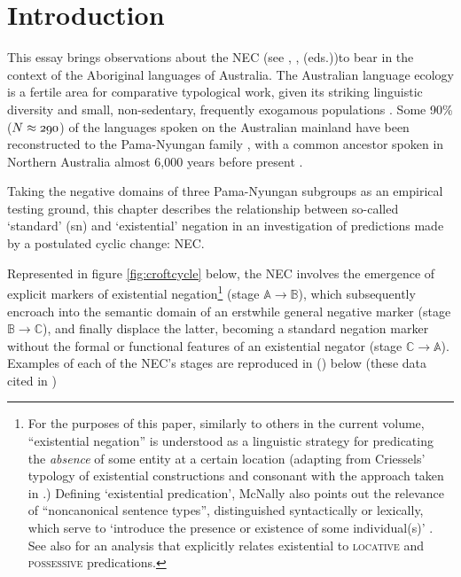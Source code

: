 \chapter*{Introduction}

\reversemarginpar
This essay brings observations about the \acrlong{NEC} (see \citealt{Croft1991}, \citealt{Veselinova2013,Veselinova2016}, \citealt{Hamari} (eds.))to bear in the context of the Aboriginal languages of Australia. The Australian language ecology is a fertile area for comparative typological work, given its striking linguistic diversity and small, non-sedentary, frequently exogamous populations \citep{Bowern2010}. Some 90\% ($\mathnormal{N\approx290}$) of the languages spoken on the Australian mainland have been reconstructed to the Pama-Nyungan family \citep[see also ][]{OVV1966,Wurm1972,Bowern2012b}, with a common ancestor spoken in Northern Australia almost 6,000 years before present \citep{Bouckaert2018}.

Taking the negative domains of three Pama-Nyungan subgroups as an empirical testing ground, this chapter describes the relationship between so-called `standard' (\acrshort{sn}) and `existential' negation in an investigation of predictions made by a postulated cyclic change: \acrfull{NEC}.


Represented in figure \ref{fig:croftcycle} below, the \acrshort{NEC} involves the emergence of explicit markers of existential negation\footnote{
	For the purposes of this paper, similarly to others in the current volume, ``existential negation'' is understood as a linguistic strategy for predicating the \textit{absence} of some entity at a certain location (adapting from Criessels' \citeyearpar[2]{Creissels2014} typology of existential constructions and consonant with the approach taken in \citealp[139]{Veselinova2013}.) Defining `existential predication', McNally also points out the relevance of ``noncanonical sentence types'', distinguished syntactically or lexically, which serve to `introduce the presence or existence of some individual(s)' \citeyearpar[210]{McNally2016}. See also \citealt{Freeze1992} for an analysis that explicitly relates existential to \textsc{locative} and \textsc{possessive} predications.}
  (stage $\mathbb{A\to B}$), which subsequently encroach into the semantic domain of an erstwhile general negative marker (stage $\mathbb{B\to C}$), and finally displace the latter, becoming a standard negation marker without the formal or functional features of an existential negator (stage $\mathbb{C\to A}$). Examples of each of the \acrshort{NEC}'s stages are reproduced in (\nextx) below (these data cited in \citealp[7--12]{Croft1991})
  


